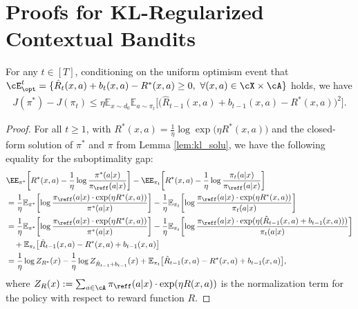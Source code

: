 \documentclass[11pt]{article}
\newcommand{\rE}{\mathbb E}
\begin{document}
\section{Proofs for KL-Regularized Contextual Bandits} \label{sec:proof_bandit}
\begin{lemma}\label{lm:regret_decompose_bandit}
    For any $t\in[T]$, conditioning on the uniform optimism event that $\cE_{\opt}^t=\{\hat{R}_t(x,a)+b_t(x,a)-R^*(x,a) \ge 0,~\forall(x,a)\in\cX\times\cA\}$ holds, we have
    \begin{align*}
        J(\pi^*) - J(\pi_t) \le \eta \rE_{x \sim d_0} \rE_{a\sim \pi_t} \bigl[\bigl(\hat R_{t - 1}(x, a) + b_{t - 1}(x, a) - R^*(x, a)\bigr)^2 \bigr].
    \end{align*}
\end{lemma}
\begin{proof}
For all $t \ge 1$, with $R^*(x,a) = \frac{1}{\eta}\log \exp \big(\eta R^*(x,a)\big)$ and the closed-form solution of $\pi^*$ and $\pi$ from Lemma \ref{lem:kl_solu}, we have the following equality for the suboptimality gap: 
\begin{align} 
    &\EE_{\pi^*} \bigg[R^*(x,a) - \frac{1}{\eta}\log\frac{\pi^*(a|x)}{\pi_{\reff}(a|x)}\bigg] - \EE_{\pi_{t}} \bigg[R^*(x, a) - \frac{1}{\eta}\log \frac{\pi_{t}(a|x)}{\pi_{\reff}(a|x)}\bigg] \notag
    \\&= \frac{1}{\eta} \rE_{\pi^*} \biggl[\log \frac{\pi_{\reff}(a|x) \cdot \exp(\eta R^*(x, a))}{\pi^*(a|x)}\biggr] - \frac{1}{\eta} \rE_{\pi_{t}} \biggl[\log \frac{\pi_{\reff}(a|x) \cdot \exp(\eta R^*(x, a))}{\pi_{t}(a|x)}\biggr]\notag
    \\&= \frac{1}{\eta} \rE_{\pi^*} \biggl[\log \frac{\pi_{\reff}(a|x) \cdot \exp(\eta R^*(x, a))}{\pi^*(a|x)}\biggr] - \frac{1}{\eta} \rE_{\pi_{t}} \biggl[\log \frac{\pi_{\reff}(a|x) \cdot \exp(\eta (\hat R_{t - 1} (x, a) + b_{t - 1}(x, a)))}{\pi_{t}(a|x)}\biggr] \notag
    \\&\quad + \rE_{\pi_{t}} \big[\hat R_{t - 1}(x, a) - R^*(x, a) + b_{t-1}(x, a)\big]\notag\\
    &= \frac{1}{\eta} \log Z_{R^*}(x) - \frac{1}{\eta} \log Z_{\hat R_{t - 1} + b_{t - 1} }(x) + \rE_{\pi_{t}} \big[\hat R_{t - 1}(x, a) - R^*(x, a) + b_{t-1}(x, a)\big],
    \label{eq:suboptimality-gap}
\end{align}
where $Z_R(x) := \sum_{a \in \cA} \pi_{\reff}(a|x) \cdot \exp(\eta R(x, a))$ is the normalization term for the policy with respect to reward function $R$.



\end{proof}
\end{document}
